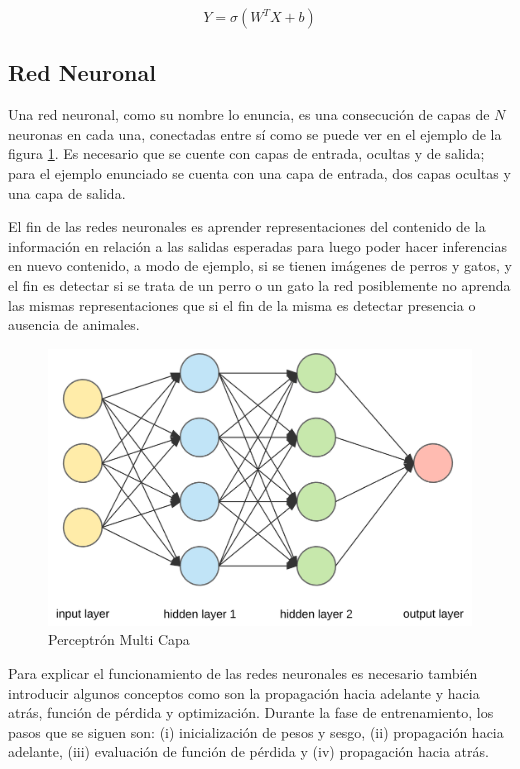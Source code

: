 \begin{equation}
Y=\sigma\left(W^{T} X+b\right)
\end{equation}


\subsection{Red Neuronal}\label{red_neuronal}
 Una red neuronal, como su nombre lo enuncia, es una consecución de capas de \(N\) neuronas en cada una, conectadas entre sí como se puede ver en el ejemplo de la figura \ref{fig:redneuronal}. Es necesario que se cuente con capas de entrada, ocultas y de salida; para el ejemplo enunciado se cuenta con una capa de entrada, dos capas ocultas y una capa de salida. 
 
 El fin de las redes neuronales es aprender representaciones del contenido de la información en relación a las salidas esperadas para luego poder hacer inferencias en nuevo contenido, a modo de ejemplo, si se tienen imágenes de perros y gatos, y el fin es detectar si se trata de un perro o un gato la red posiblemente no aprenda las mismas representaciones que si el fin de la misma es detectar presencia o ausencia de animales.
 
 
 \begin{figure}[!h]
 	\centering
 	\includegraphics[width=0.7\linewidth]{images/red_neuronal}
 	\caption[Ejemplo red neuronal]{Perceptrón Multi Capa}
 	\label{fig:redneuronal}
 \end{figure}
 Para explicar el funcionamiento de las redes neuronales es necesario también introducir algunos conceptos como son la propagación hacia adelante y hacia atrás, función de pérdida y optimización. Durante la fase de entrenamiento, los pasos que se siguen son:
 (i) inicialización de pesos y sesgo, (ii) propagación hacia adelante, (iii) evaluación de función de pérdida y (iv) propagación hacia atrás.
 
